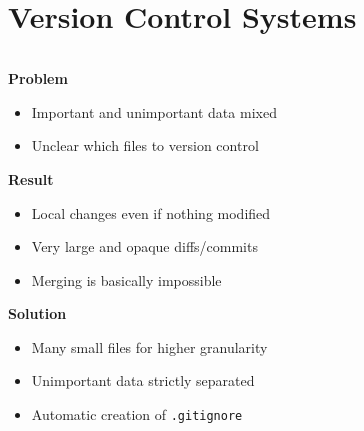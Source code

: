 \section{Version Control Systems}

\begin{frame}{\secname}

  \begin{columns}[onlytextwidth]
    \begin{column}{\textwidth-3.5cm}
      \textbf{Problem}
      \begin{itemize}
        \item Important and unimportant data mixed
        \item Unclear which files to version control
      \end{itemize}

      \pause

      \textbf{Result}
      \begin{itemize}
        \item Local changes even if nothing modified
        \item Very large and opaque diffs/commits
        \item Merging is basically impossible
      \end{itemize}

      \pause

      \textbf{Solution}
      \begin{itemize}
        \item Many small files for higher granularity
        \item Unimportant data strictly separated
        \item Automatic creation of \texttt{.gitignore}
      \end{itemize}
    \end{column}

    \hfill

    \begin{column}{3.5cm}
      \color{blue}
    \end{column}
  \end{columns}
\end{frame}
